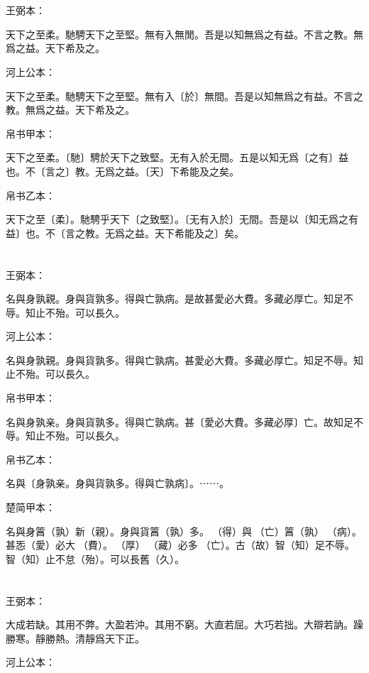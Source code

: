 \documentclass[a5paper]{ctexbook}
\begin{document}
    \chapter{}
    王弼本：

    天下之至柔。馳騁天下之至堅。無有入無閒。吾是以知無爲之有益。不言之教。無爲之益。天下希及之。

    河上公本：

    天下之至柔。馳騁天下之至堅。無有入〔於〕無間。吾是以知無爲之有益。不言之教。無爲之益。天下希及之。

    帛书甲本：

    天下之至柔。〔馳〕騁於天下之致堅。无有入於无間。五是以知无爲〔之有〕益也。不〔言之〕教。无爲之益。〔天〕下希能及之矣。

    帛书乙本：

    天下之至〔柔〕。馳騁乎天下〔之致堅〕。〔无有入於〕无間。吾是以〔知无爲之有益〕也。不〔言之教。无爲之益。天下希能及之〕矣。

    \chapter{}
    王弼本：

    名與身孰親。身與貨孰多。得與亡孰病。是故甚愛必大費。多藏必厚亡。知足不辱。知止不殆。可以長久。

    河上公本：

    名與身孰親。身與貨孰多。得與亡孰病。甚愛必大費。多藏必厚亡。知足不辱。知止不殆。可以長久。

    帛书甲本：

    名與身孰亲。身與貨孰多。得與亡孰病。甚〔愛必大費。多藏必厚〕亡。故知足不辱。知止不殆。可以長久。

    帛书乙本：

    名與〔身孰亲。身與貨孰多。得與亡孰病〕。⋯⋯。

    楚简甲本：

    名與身䈞（孰）新（親）。身與貨䈞（孰）多。󰴼（得）與󶵔（亡）䈞（孰）󶓄（病）。甚㤅（愛）必大󶵖（費）。󶵗（厚）󶤖（藏）必多󶵔（亡）。古（故）智（知）足不辱。智（知）止不怠（殆）。可以長舊（久）。

    \chapter{}
    王弼本：

    大成若缺。其用不弊。大盈若沖。其用不窮。大直若屈。大巧若拙。大辯若訥。躁勝寒。靜勝熱。清靜爲天下正。

    河上公本：
\end{document}
